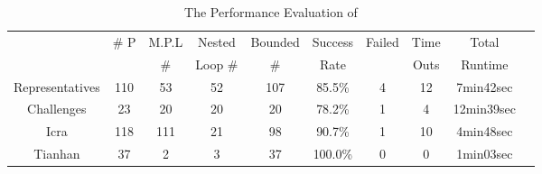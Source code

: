 \begin{table}[H]
 \vspace{-1cm}
    \caption{The Performance Evaluation of {\THESYSTEM}}
    \label{tb:performance-eval}
    \centering
        {\scriptsize
        \begin{tabular}{ >{\small}c | c | c | c | c | c | c | c | c | c }
            \multirow{2}{*}{Benchmarks} & \multirow{2}{*}{\# P}  & {M.P.L} & Nested  & {Bounded} & {Success} & \multirow{2}{*}{Failed} & Time  & Total\\
             &  & \# & Loop \# & \# & Rate &  & Outs &   Runtime \\
            \hline
                {Representatives} & {110}  & 53  & 52  & 107 & 85.5\% & 4 & 12 & 7min42sec \\
                \hline
                Challenges & 23  & 20 & 20 & {20} & {78.2\%}  & 1 & 4 & {12min39sec} \\
                \hline
                {Icra} & 118 & 111 & 21 & 98 & 90.7\% & 1 & 10 & {4min48sec} \\
                \hline
                Tianhan & 37 & 2 & 3 & 37 & 100.0\% & 0 & 0 & 1min03sec \\
                \hline
            \end{tabular}    
        }
 \vspace{-0.2cm}
    \end{table}